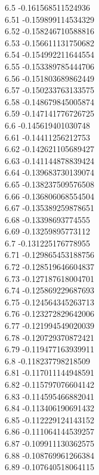 {6.5	-0.161568511524936\\
6.51	-0.159899114534329\\
6.52	-0.158246710588816\\
6.53	-0.156611131750682\\
6.54	-0.154992211644554\\
6.55	-0.153389785444706\\
6.56	-0.151803689862449\\
6.57	-0.150233763133575\\
6.58	-0.148679845005874\\
6.59	-0.147141776726725\\
6.6	-0.145619401030748\\
6.61	-0.14411256212753\\
6.62	-0.142621105689427\\
6.63	-0.141144878839424\\
6.64	-0.139683730139074\\
6.65	-0.138237509576508\\
6.66	-0.136806068554504\\
6.67	-0.135389259878651\\
6.68	-0.13398693774555\\
6.69	-0.13259895773112\\
6.7	-0.131225176778955\\
6.71	-0.129865453188756\\
6.72	-0.128519646604837\\
6.73	-0.127187618004701\\
6.74	-0.125869229687693\\
6.75	-0.124564345263713\\
6.76	-0.123272829642006\\
6.77	-0.121994549020039\\
6.78	-0.120729370872421\\
6.79	-0.119477163939911\\
6.8	-0.118237798218509\\
6.81	-0.117011144948591\\
6.82	-0.115797076604142\\
6.83	-0.114595466882041\\
6.84	-0.113406190691432\\
6.85	-0.112229124143152\\
6.86	-0.111064144539257\\
6.87	-0.109911130362575\\
6.88	-0.108769961266384\\
6.89	-0.107640518064115\\
}
